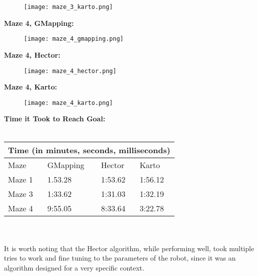 \documentclass{article}
\begin{document}
\begin{figure}[htbp]
    \centering
    \texttt{[image: maze\_3\_karto.png]} 
\end{figure}
\pagebreak
{\bf Maze 4, GMapping:}

\begin{figure}[htbp]
    \centering
    \texttt{[image: maze\_4\_gmapping.png]} 
\end{figure}
{\bf Maze 4, Hector:}

\begin{figure}[htbp]
    \centering
    \texttt{[image: maze\_4\_hector.png]} 
\end{figure}
\pagebreak
{\bf Maze 4, Karto:}

\begin{figure}[htbp]
    \centering
    \texttt{[image: maze\_4\_karto.png]} 
\end{figure}

{\bf Time it Took to Reach Goal:} \\\\
\begin{tabular}{ |p{3cm}||p{3cm}|p{3cm}|p{3cm}|  }
 \hline
 \multicolumn{4}{|c|}{Time (in minutes, seconds, milliseconds)} \\
 \hline
 Maze & GMapping &Hector & Karto\\
 \hline
 Maze 1   & 1.53.28    &1:53.62&   1:56.12\\
 Maze 3 &  1:33.62  & 1:31.03   &1:32.19\\
 Maze 4  &9:55.05 & 8:33.64&  3:22.78\\
 \hline
\end{tabular}
\\
\\
It is worth noting that the Hector algorithm, while performing well, took multiple tries to work and fine tuning to the parameters of the robot, since it was an algorithm designed for a very specific context. 




\end{document}
